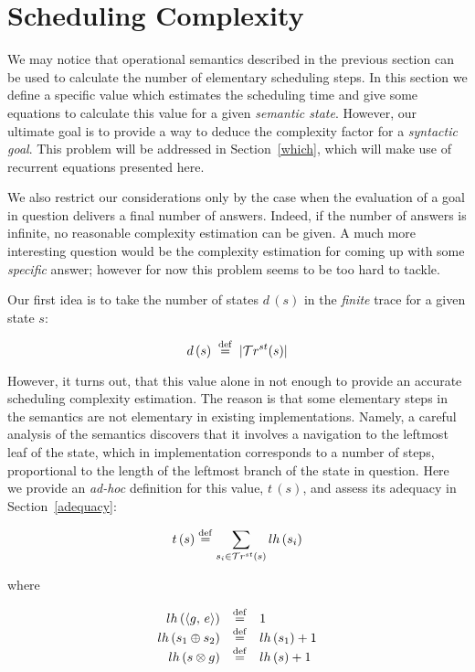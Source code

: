 \section{Scheduling Complexity}
\label{sec:scheduling}

We may notice that operational semantics described in the previous section can be used to calculate the number of elementary scheduling steps.
In this section we define a specific value which estimates the scheduling time and give some equations to calculate this value for a given \emph{semantic
state}. However, our ultimate goal is to provide a way to deduce the complexity factor for a \emph{syntactic goal}. This problem will be addressed in
Section~\ref{which}, which will make use of recurrent equations presented here.

We also restrict our considerations only by the case when the evaluation of a goal in question delivers a final number of answers. Indeed,
if the number of answers is infinite, no reasonable complexity estimation can be given. A much more interesting question would be
the complexity estimation for coming up with some \emph{specific} answer; however for now this problem seems to be too hard to
tackle.

Our first idea is to take the number of states $d\,(s)$ in the \emph{finite} trace for a given state $s$:

\[ d\,(s) \; \overset{\mathrm{def}}{=} \; | \mathcal{T}r^{st}(s) |  \]

However, it turns out, that this value alone in not enough to provide an accurate scheduling complexity estimation. The reason is that some
elementary steps in the semantics are not elementary in existing implementations. Namely, a careful analysis of the semantics discovers that
it involves a navigation to the leftmost leaf of the state, which in implementation corresponds to a number of
steps, proportional to the length of the leftmost branch of the state in question. Here we provide an \emph{ad-hoc} definition for this value, $t\,(s)$, and
assess its adequacy in Section~\ref{adequacy}:

\[
t\,(s) \overset{\mathrm{def}}{=} \sum\limits_{s_i \in \mathcal{T}r^{st}(s)} lh\,(s_i) 
\]

where

\[
\begin{array}{rcl}
 lh\,(\langle g ,\, e \rangle)  &\overset{\mathrm{def}}{=}& 1 \\
 lh\,(s_1 \oplus s_2) &\overset{\mathrm{def}}{=}& lh\,(s_1) + 1 \\
 lh\,(s \otimes g)    &\overset{\mathrm{def}}{=}& lh\,(s) + 1 \\
\end{array}
\]


